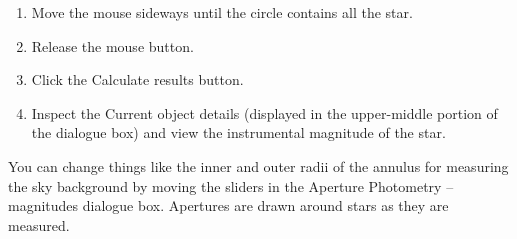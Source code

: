 \documentclass[twoside,11pt]{article}
\renewcommand{\_}{\texttt{\symbol{95}}}
\begin{document}
\begin{enumerate}
\begin{enumerate}
     \item Move the mouse sideways until the circle contains all the star.

     \item Release the mouse button.

     \item Click the {\sf Calculate results} button.

     \item Inspect the {\sf Current object details} (displayed in the
      upper-middle portion of the dialogue box) and view the instrumental
      magnitude of the star.

  \end{enumerate}

   You can change things like the inner and outer radii of the annulus for
   measuring the sky background by moving the sliders in the {\sf Aperture
   Photometry -- magnitudes} dialogue box.  Apertures are drawn around
   stars as they are measured.


\end{enumerate}
\end{document}
